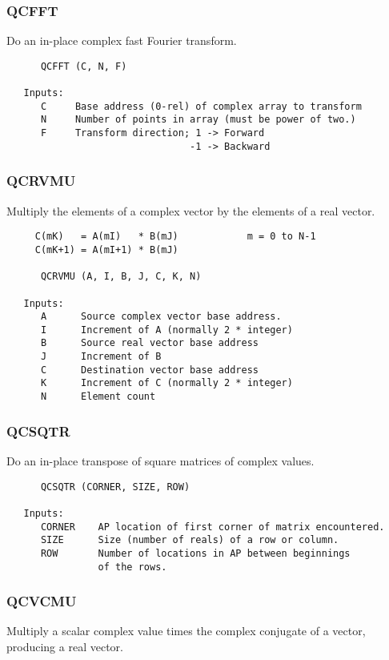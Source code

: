 \subsubsection{QCFFT }
Do an in-place complex fast Fourier transform.

\begin{verbatim}
      QCFFT (C, N, F)

   Inputs:
      C     Base address (0-rel) of complex array to transform
      N     Number of points in array (must be power of two.)
      F     Transform direction; 1 -> Forward
                                -1 -> Backward

\end{verbatim}
\subsubsection{QCRVMU }
Multiply the elements of a complex vector by the elements of a real
vector.
\begin{verbatim}
     C(mK)   = A(mI)   * B(mJ)            m = 0 to N-1
     C(mK+1) = A(mI+1) * B(mJ)

      QCRVMU (A, I, B, J, C, K, N)

   Inputs:
      A      Source complex vector base address.
      I      Increment of A (normally 2 * integer)
      B      Source real vector base address
      J      Increment of B
      C      Destination vector base address
      K      Increment of C (normally 2 * integer)
      N      Element count

\end{verbatim}
\subsubsection{QCSQTR }
Do an in-place transpose of square matrices of complex values.

\begin{verbatim}
      QCSQTR (CORNER, SIZE, ROW)

   Inputs:
      CORNER    AP location of first corner of matrix encountered.
      SIZE      Size (number of reals) of a row or column.
      ROW       Number of locations in AP between beginnings
                of the rows.

\end{verbatim}
\subsubsection{QCVCMU }
Multiply a scalar complex value times the complex conjugate of a
vector, producing a real vector.

